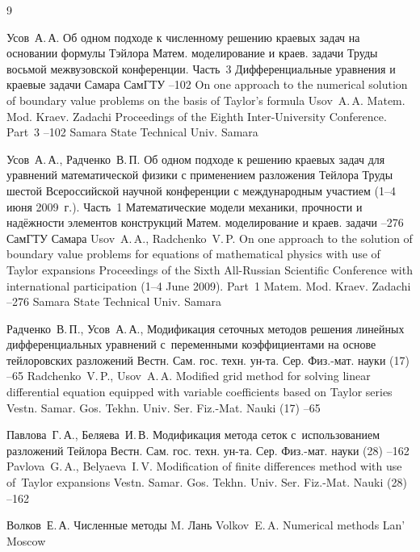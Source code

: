 \begin{thebibliography}{9}

\by Усов~А.\,А.
\paper Об одном подходе к численному решению краевых задач на основании формулы Тэйлора
\serial Матем. моделирование и краев. задачи
\inbook Труды восьмой межвузовской конференции. \rm  Часть~3
\bookinfo Дифференциальные уравнения и краевые задачи
\publaddr Самара
\publ СамГТУ
--102
\misctransl
\paper On one approach to the numerical solution of boundary value problems on the basis of Taylor's formula
\by Usov~A.\,A.
\serial Matem. Mod. Kraev. Zadachi
\inbook Proceedings of the Eighth Inter-University Conference. \rm Part~3
--102
\publ Samara State Technical Univ.
\publaddr Samara

\by Усов~А.\,А., Радченко~В.\,П.
\paper Об одном подходе к решению краевых задач для уравнений математической физики с применением разложения Тейлора
\inbook Труды шестой Всероссийской научной конференции с международным участием \rm (1--4 июня 2009~г.). Часть~1
\bookinfo Математические модели механики, прочности и надёжности элементов конструкций
\serial Матем. моделирование и краев. задачи
--276
\publ СамГТУ
\publaddr Самара
\misctransl
\by Usov~A.\,A., Radchenko~V.\,P.
\paper On one approach to the solution of boundary value problems for equations of mathematical physics with use of Taylor expansions
\inbook Proceedings of the Sixth All-Russian Scientific Conference with international participation \rm (1--4 June 2009). Part~1
\serial Matem. Mod. Kraev. Zadachi
--276
\publ Samara State Technical Univ.
\publaddr Samara

\by  Радченко~В.\,П., Усов~А.\,А.,
\paper Модификация сеточных методов решения линейных дифференциальных уравнений с~переменными коэффициентами на основе тейлоровских разложений
\jour Вестн. Сам. гос. техн. ун-та. Сер. Физ.-мат. науки
(17)
--65
\misctransl
\by Radchenko~V.\,P., Usov~A.\,A.
\paper Modified grid method for solving linear differential equation equipped with variable coefficients based on Taylor series
\jour Vestn. Samar. Gos. Tekhn. Univ. Ser. Fiz.-Mat. Nauki
(17)
--65

\by Павлова~Г.\,А., Беляева~И.\,В.
\paper Модификация метода сеток с~использованием разложений Тейлора
\jour Вестн. Сам. гос. техн. ун-та. Сер. Физ.-мат. науки
(28)
--162
\misctransl
\by Pavlova~G.\,A., Belyaeva~I.\,V.
\paper Modification of finite differences method with use of~Taylor expansions
\jour Vestn. Samar. Gos. Tekhn. Univ. Ser. Fiz.-Mat. Nauki
(28)
--162

\by Волков~Е.\,А.
\book Численные методы
\publaddr M.
\publ Лань
\misctransl
\by Volkov~E.\,A.
\book Numerical methods
\publ Lan'
\publaddr Moscow



\end{thebibliography}

